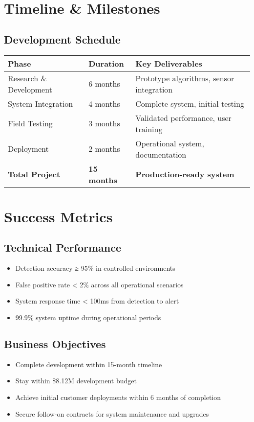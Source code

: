 \documentclass[11pt,a4paper]{article}
\begin{document}
\section{Timeline \& Milestones}

\subsection{Development Schedule}
\begin{center}
\begin{tabular}{lll}
\toprule
\textbf{Phase} & \textbf{Duration} & \textbf{Key Deliverables} \\
\midrule
Research \& Development & 6 months & Prototype algorithms, sensor integration \\
System Integration & 4 months & Complete system, initial testing \\
Field Testing & 3 months & Validated performance, user training \\
Deployment & 2 months & Operational system, documentation \\
\midrule
\textbf{Total Project} & \textbf{15 months} & \textbf{Production-ready system} \\
\bottomrule
\end{tabular}
\end{center}

\section{Success Metrics}

\subsection{Technical Performance}
\begin{itemize}[leftmargin=2em]
    \item Detection accuracy ≥ 95\% in controlled environments
    \item False positive rate < 2\% across all operational scenarios
    \item System response time < 100ms from detection to alert
    \item 99.9\% system uptime during operational periods
\end{itemize}

\subsection{Business Objectives}
\begin{itemize}[leftmargin=2em]
    \item Complete development within 15-month timeline
    \item Stay within \$8.12M development budget
    \item Achieve initial customer deployments within 6 months of completion
    \item Secure follow-on contracts for system maintenance and upgrades
\end{itemize}
\end{document}
